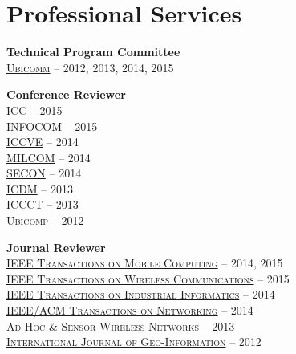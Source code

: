\section{\sc Professional Services}
{\bf Technical Program Committee}\\
{\href{http://www.iaria.org/conferences.html}{\textsc{Ubicomm}}} -- 2012, 2013, 2014, 2015

{\bf Conference Reviewer}\\
{\href{http://icc2015.ieee-icc.org/}{\textsc{ICC}}} -- 2015\\
{\href{http://infocom2015.ieee-infocom.org/}{\textsc{INFOCOM}}} -- 2015\\
{\href{http://www.iccve.org/2014/}{\textsc{ICCVE}}} -- 2014\\
{\href{http://www.milcom.org/2014/}{\textsc{MILCOM}}} -- 2014\\
{\href{http://secon2014.ieee-secon.org}{\textsc{SECON}}} -- 2014\\
{\href{http://icdm2013.rutgers.edu}{\textsc{ICDM}}} -- 2013\\
{\href{http://www.mnnit.ac.in/iccct2013}{\textsc{ICCCT}}} -- 2013\\
{\href{http://www.ubicomp.org/ubicomp2012}{\textsc{Ubicomp}}} -- 2012

{\bf Journal Reviewer}\\
{\href{http://www.computer.org/portal/web/tmc}{\textsc{IEEE Transactions on Mobile Computing}}} -- 2014, 2015\\
{\href{http://www.comsoc.org/twc}{\textsc{IEEE Transactions on Wireless Communications}}} -- 2015\\
{\href{http://tii.ieee-ies.org}{\textsc{IEEE Transactions on Industrial Informatics}}} -- 2014\\
{\href{http://www.ifp.illinois.edu/ton}{\textsc{IEEE/ACM Transactions on Networking}}} -- 2014\\
{\href{http://www.oldcitypublishing.com/AHSWN/AHSWN.html}{\textsc{Ad Hoc \& Sensor Wireless Networks}}} -- 2013\\
{\href{http://www.mdpi.com/journal/ijgi}{\textsc{International Journal of Geo-Information}}} -- 2012
